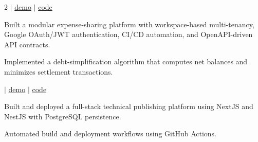 \documentclass[]{hieudo-build}
\begin{document}
\begin{paracol}{2}
 $|$ \href{https://expensesplit-mauve.vercel.app/login}{demo} $|$ \href{https://github.com/Vikramadtya/ExpenseSplit}{code}

\begin{tightemize}
\item Built a modular expense-sharing platform with workspace-based multi-tenancy, Google OAuth/JWT authentication, CI/CD automation, and OpenAPI-driven API contracts.
\item Implemented a debt-simplification algorithm that computes net balances and minimizes settlement transactions.
\end{tightemize}
\sectionsep 

 $|$ \href{https://www.neuralcook.com}{demo} $|$ \href{https://github.com/Vikramadtya/Blog}{code}

\begin{tightemize}
\item Built and deployed a full-stack technical publishing platform using NextJS and NestJS with PostgreSQL persistence.
\item Automated build and deployment workflows using GitHub Actions.
\end{tightemize}
\sectionsep 

\end{paracol}
\end{document}
